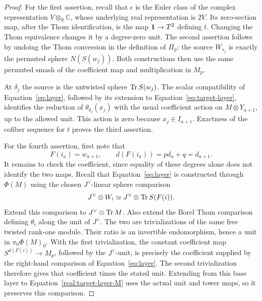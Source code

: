 \begin{proof}
For the first assertion, recall that \(\epsilon\) is the Euler
class of the complex representation
\(V\otimes_{\mathbb R}\mathbb C\), whose underlying real
representation is \(2V\).  Its zero-section map, after the Thom
identification, is the map \(\mathbf 1\to T^2\) defining \(t\).
Changing the Thom equivalence changes it by a degree-zero unit.
The second assertion follows by undoing the Thom conversion in the
definition of \(\Pi_p\): the source \(W_{s_j}\) is exactly
the permuted sphere \(N(S(w_j))\).  Both constructions then use
the same permuted smash of the coefficient map and multiplication
in \(M_p\).

At \(\delta_j\) the source is the untwisted sphere
\(\operatorname{Tr} S(w_j)\).  The scalar compatibility of
Equation~\eqref{eq:layer}, followed by its extension to
Equation~\eqref{eq:target-layer}, identifies the reduction of
\(\theta_{\delta_j}(x_j)\) with the usual coefficient action
on \(M\otimes Y_{a+1}\), up to the allowed unit.  This action
is zero because \(x_j\in I_{a+1}\).  Exactness of the
cofiber sequence for \(t\) proves the third assertion.

For the fourth assertion, first note that
\[
 F(i_a)=w_{a+1},\qquad
 d(F(i_a))=p d_a+q=d_{a+1}.
\]
It remains to check the coefficient, since equality of these degrees
alone does not identify the two maps.  Recall that
Equation~\eqref{eq:layer} is constructed through \(\Phi(M)\)
using the chosen \(J^\vee\)-linear sphere comparison
\[
 J^\vee\otimes W_i\simeq
 J^\vee\otimes\operatorname{Tr} S(F(i)).
\]
Extend this comparison to \(J^\vee\otimes\operatorname{Tr} M\).  Also
extend the Borel Thom comparison defining \(\theta_i\) along
the unit of \(J^\vee\).  The two are trivializations of the
same free twisted rank-one module.  Their ratio is an invertible
endomorphism, hence a unit in \(\pi_0\Phi(M)_0\).
With the first trivialization, the constant coefficient map
\(S^{d(F(i))}\to M_p\), followed by the \(J^\vee\)-unit,
is precisely the coefficient supplied by the right-hand comparison
of Equation~\eqref{eq:layer}.  The second trivialization therefore
gives that coefficient times the stated unit.  Extending from this
base layer to Equation~\eqref{real:target-layer-M} uses the actual
unit and tower maps, so it preserves this comparison.


\end{proof}
